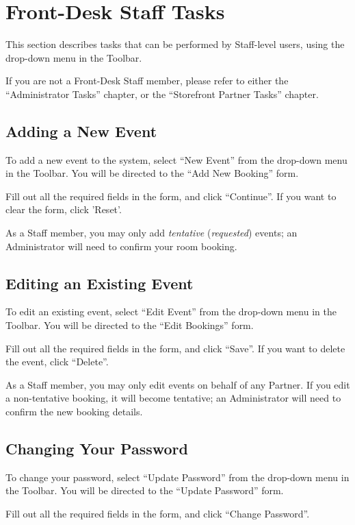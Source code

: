 \section{Front-Desk Staff Tasks}

This section describes tasks that can be performed by Staff-level users, using the drop-down menu in the Toolbar.

If you are not a Front-Desk Staff member, please refer to either the ``Administrator Tasks'' chapter, or the ``Storefront Partner Tasks'' chapter.


\subsection{Adding a New Event}

To add a new event to the system, select ``New Event'' from the drop-down menu in the Toolbar. You will be directed to the ``Add New Booking'' form.

Fill out all the required fields in the form, and click ``Continue''. If you want to clear the form, click 'Reset'.

As a Staff member, you may only add \textit{tentative} (\textit{requested}) events; an Administrator will need to confirm your room booking.


\subsection{Editing an Existing Event}

To edit an existing event, select ``Edit Event'' from the drop-down menu in the Toolbar. You will be directed to the ``Edit Bookings'' form.

Fill out all the required fields in the form, and click ``Save''. If you want to delete the event, click ``Delete''.

As a Staff member, you may only edit events on behalf of any Partner. If you edit a non-tentative booking, it will become tentative; an Administrator will need to confirm the new booking details.


\subsection{Changing Your Password}

To change your password, select ``Update Password'' from the drop-down menu in the Toolbar. You will be directed to the ``Update Password'' form.

Fill out all the required fields in the form, and click ``Change Password''.


